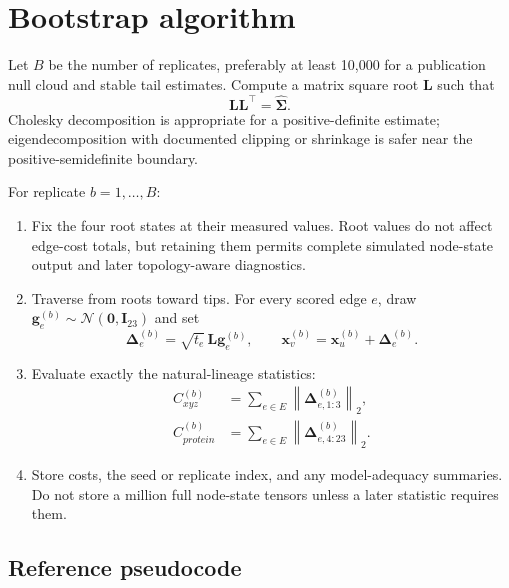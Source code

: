 \documentclass[10pt]{article}
\newcommand{\Normal}{\mathcal{N}}
\begin{document}
\section{Bootstrap algorithm}

Let $B$ be the number of replicates, preferably at least 10,000 for a
publication null cloud and stable tail estimates.  Compute a matrix square root
$\mathbf{L}$ such that
\[
  \mathbf{L}\mathbf{L}^\top=\widehat{\boldsymbol\Sigma}.
\]
Cholesky decomposition is appropriate for a positive-definite estimate;
eigendecomposition with documented clipping or shrinkage is safer near the
positive-semidefinite boundary.

For replicate $b=1,\ldots,B$:

\begin{enumerate}
  \item Fix the four root states at their measured values.  Root values do not
        affect edge-cost totals, but retaining them permits complete simulated
        node-state output and later topology-aware diagnostics.
  \item Traverse from roots toward tips.  For every scored edge $e$, draw
        $\mathbf{g}_e^{(b)}\sim\Normal(\mathbf{0},\mathbf{I}_{23})$ and set
        \[
          \boldsymbol\Delta_e^{(b)}
          = \sqrt{t_e}\,\mathbf{L}\mathbf{g}_e^{(b)},
          \qquad
          \mathbf{x}_v^{(b)}
          = \mathbf{x}_u^{(b)}+\boldsymbol\Delta_e^{(b)}.
        \]
  \item Evaluate exactly the natural-lineage statistics:
        \begin{align}
          C_{xyz}^{(b)} &=
            \sum_{e\in E}\left\|\boldsymbol\Delta_{e,1:3}^{(b)}\right\|_2,
            \\
          C_{protein}^{(b)} & =
            \sum_{e\in E}\left\|\boldsymbol\Delta_{e,4:23}^{(b)}\right\|_2.
        \end{align}
  \item Store costs, the seed or replicate index, and any model-adequacy
        summaries.  Do not store a million full node-state tensors unless a
        later statistic requires them.
\end{enumerate}

\subsection{Reference pseudocode}
\end{document}
